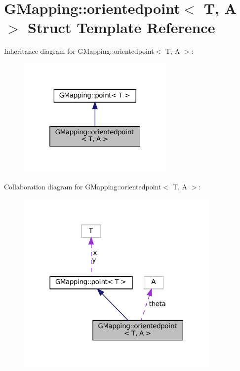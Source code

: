 \hypertarget{structGMapping_1_1orientedpoint}{}\section{G\+Mapping\+:\+:orientedpoint$<$ T, A $>$ Struct Template Reference}
\label{structGMapping_1_1orientedpoint}


Inheritance diagram for G\+Mapping\+:\+:orientedpoint$<$ T, A $>$\+:
\nopagebreak
\begin{figure}[H]
\begin{center}
\leavevmode
\includegraphics[width=217pt]{structGMapping_1_1orientedpoint__inherit__graph}
\end{center}
\end{figure}


Collaboration diagram for G\+Mapping\+:\+:orientedpoint$<$ T, A $>$\+:
\nopagebreak
\begin{figure}[H]
\begin{center}
\leavevmode
\includegraphics[width=282pt]{structGMapping_1_1orientedpoint__coll__graph}
\end{center}
\end{figure}
